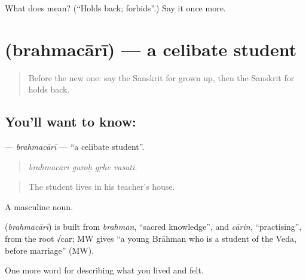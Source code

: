 \begin{tcolorbox}[breakable,colback=teal!4,colframe=teal!35!black,title={Before you move on}]
What does  mean? (\textquotedblleft{}Holds back; forbids\textquotedblright{}.) Say it once more.
\end{tcolorbox}
\section[\texorpdfstring{\sk{ब्रह्मचारी} (brahmacārī)}{ब्रह्मचारी (brahmacārī)}]{ (brahmacārī) — a celibate student}

\label{lesson:SA-C495-brahmacari}



\begin{quote}
Before the new one: say the Sanskrit for grown up, then the Sanskrit for holds back.
\end{quote}

\subsection*{You'll want to know: }
\textbf{} — \emph{brahmacārī} — \textquotedblleft{}a celibate student\textquotedblright{}.

\begin{quote}
   
\end{quote}

\begin{quote}
\emph{brahmacārī guroḥ gṛhe vasati.}
\end{quote}

\begin{quote}
The student lives in his teacher's house.
\end{quote}

A masculine noun.

\begin{cousinweb}
\textbf{} (\emph{brahmacārī}) is built from \emph{brahman}, \textquotedblleft{}sacred knowledge\textquotedblright{}, and \emph{cārin}, \textquotedblleft{}practising\textquotedblright{}, from the root √car; MW gives \textquotedblleft{}a young Brāhman who is a student of the Veda, before marriage\textquotedblright{} (MW).
\end{cousinweb}

\begin{grammarlens}[title={What you've built}]
One more word for describing what you lived and felt.
\end{grammarlens}

